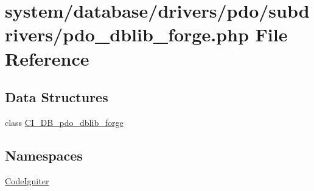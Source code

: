 \hypertarget{pdo__dblib__forge_8php}{}\section{system/database/drivers/pdo/subdrivers/pdo\+\_\+dblib\+\_\+forge.php File Reference}
\label{pdo__dblib__forge_8php}
\subsection*{Data Structures}
\begin{DoxyCompactItemize}
\item 
class \mbox{\hyperlink{class_c_i___d_b__pdo__dblib__forge}{C\+I\+\_\+\+D\+B\+\_\+pdo\+\_\+dblib\+\_\+forge}}
\end{DoxyCompactItemize}
\subsection*{Namespaces}
\begin{DoxyCompactItemize}
\item 
 \mbox{\hyperlink{namespace_code_igniter}{Code\+Igniter}}
\end{DoxyCompactItemize}
